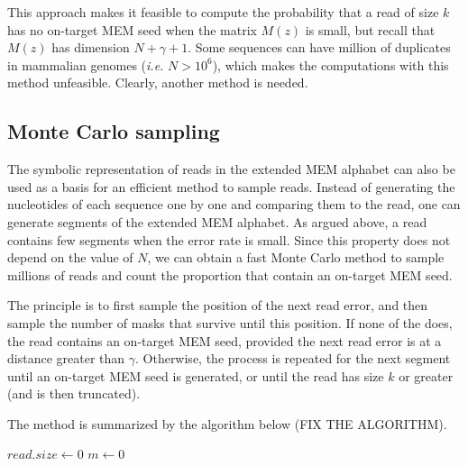 \documentclass{article}
\begin{document}
This approach makes it feasible to compute the probability that a read of
size $k$ has no on-target MEM seed when the matrix $M(z)$ is small, but
recall that $M(z)$ has dimension $N+\gamma+1$. Some sequences can have
million of duplicates in mammalian genomes (\textit{i.e.} $N > 10^6$),
which makes the computations with this method unfeasible. Clearly, another
method is needed.


\subsection{Monte Carlo sampling}

The symbolic representation of reads in the extended MEM alphabet can also
be used as a basis for an efficient method to sample reads. Instead of
generating the nucleotides of each sequence one by one and comparing them
to the read, one can generate segments of the extended MEM alphabet. As
argued above, a read contains few segments when the error rate is small.
Since this property does not depend on the value of $N$, we can obtain a
fast Monte Carlo method to sample millions of reads and count the
proportion that contain an on-target MEM seed.

The principle is to first sample the position of the next read error, and
then sample the number of masks that survive until this position. If none
of the does, the read contains an on-target MEM seed, provided the next
read error is at a distance greater than $\gamma$. Otherwise, the process
is repeated for the next segment until an on-target MEM seed is generated,
or until the read has size $k$ or greater (and is then truncated).

The method is summarized by the algorithm below (FIX THE ALGORITHM).

\begin{algorithm}[H]
\SetAlgoLined
{}
  $read.size \leftarrow 0$\;
  $m \leftarrow 0$ 
\end{algorithm}
\end{document}
